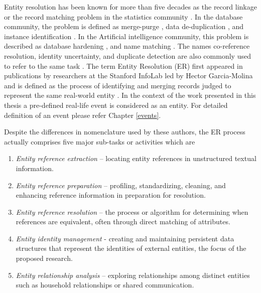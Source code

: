 Entity resolution has been known for more than five decades as the record linkage or the record matching problem in the statistics community \cite{fellegi1969theory,newcombe1959automatic,herzog2007data}. In the database community, the problem is defined as merge-purge \cite{hernandez1998real}, data de-duplication \cite{sarawagi2002interactive,ananthakrishna2002eliminating}, and instance identification \cite{wang1989inter}. In the Artificial intelligence community, this problem is described as database hardening \cite{cohen2000hardening}, and name matching \cite{bilenko2003adaptive}. The names co-reference resolution, identity uncertainty, and duplicate detection are also commonly used to refer to the same task \cite{elmagarmid2007duplicate}. The term Entity Resolution (ER) first appeared in publications by researchers at the Stanford InfoLab led by Hector Garcia-Molina and is defined as the process of identifying and merging records judged to represent the same real-world entity \cite{garcia2006pair}. In the context of the work presented in this thesis a pre-defined real-life event is considered as an entity. For detailed definition of an event please refer Chapter \ref{events}.

Despite the differences in nomenclature used by these authors, the ER process actually comprises five major sub-tasks or activities \cite{talburt2011entity} which are
\begin{enumerate} 
\item	\textit{Entity reference extraction} – locating entity references in unstructured textual information.
\item	\textit{Entity reference preparation} – profiling, standardizing, cleaning, and enhancing reference information in preparation for resolution.
\item	\textit{Entity reference resolution} – the process or algorithm for determining when references are equivalent, often through direct matching of attributes.
\item	\textit{Entity identity management} - creating and maintaining persistent data structures that represent the identities of external entities, the focus of the proposed research.
\item	\textit{Entity relationship analysis} – exploring relationships among distinct entities such as household relationships or shared communication.
\end{enumerate}

